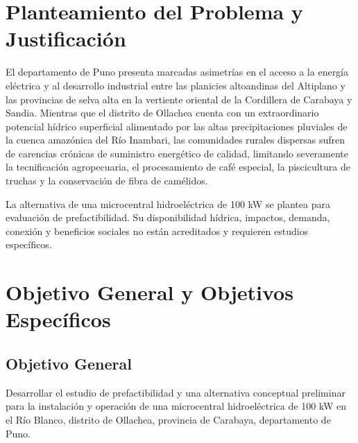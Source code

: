 \documentclass[11pt,a4paper]{report}
\begin{document}
\section{Planteamiento del Problema y Justificación}
El departamento de Puno presenta marcadas asimetrías en el acceso a la energía eléctrica y al desarrollo industrial entre las planicies altoandinas del Altiplano y las provincias de selva alta en la vertiente oriental de la Cordillera de Carabaya y Sandia. Mientras que el distrito de Ollachea cuenta con un extraordinario potencial hídrico superficial alimentado por las altas precipitaciones pluviales de la cuenca amazónica del Río Inambari, las comunidades rurales dispersas sufren de carencias crónicas de suministro energético de calidad, limitando severamente la tecnificación agropecuaria, el procesamiento de café especial, la piscicultura de truchas y la conservación de fibra de camélidos.

La alternativa de una microcentral hidroeléctrica de 100 kW se plantea para evaluación de prefactibilidad. Su disponibilidad hídrica, impactos, demanda, conexión y beneficios sociales no están acreditados y requieren estudios específicos.

\section{Objetivo General y Objetivos Específicos}
\subsection{Objetivo General}
Desarrollar el estudio de prefactibilidad y una alternativa conceptual preliminar para la instalación y operación de una microcentral hidroeléctrica de 100 kW en el Río Blanco, distrito de Ollachea, provincia de Carabaya, departamento de Puno.
\end{document}
